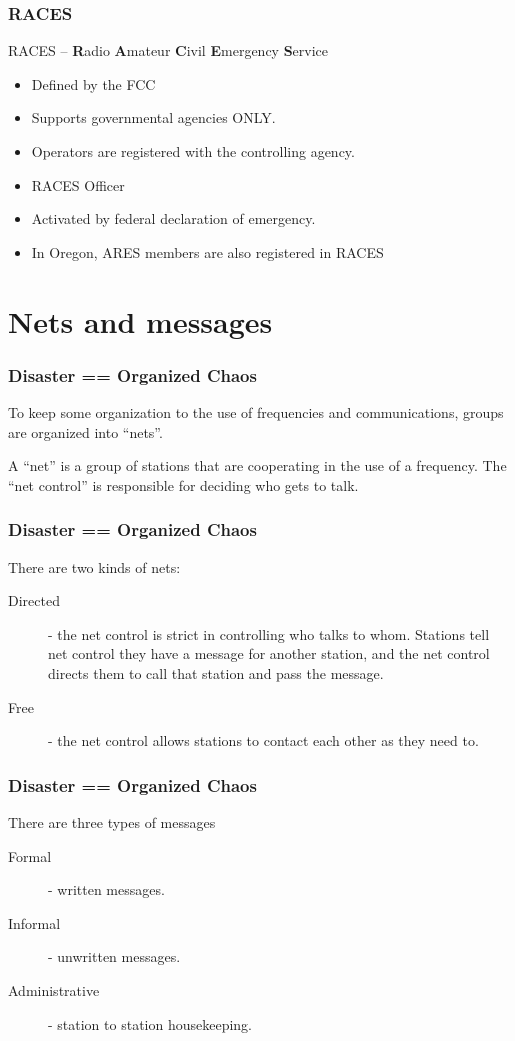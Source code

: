 \documentclass[10pt]{beamer}
\begin{document}
\begin{frame}
\frametitle{RACES}
RACES – \textbf{R}adio \textbf{A}mateur \textbf{C}ivil \textbf{E}mergency \textbf{S}ervice
\begin{itemize}
\item Defined by the FCC
\item Supports governmental agencies ONLY.
\item Operators are registered with the controlling agency. 
\item RACES Officer
\item Activated by federal declaration of emergency. 
\item In Oregon, ARES members are also registered in RACES
\end{itemize}
\end{frame}

\section{Nets and messages}
\begin{frame}
\frametitle{Disaster == Organized Chaos}
To keep some organization to the use of frequencies and communications,  groups are organized into “nets”.

A “net” is a group of stations that are cooperating in the use of a frequency. The “net control” is responsible for deciding who gets to talk. 
\end{frame}

\begin{frame}
\frametitle{Disaster == Organized Chaos}
There are two kinds of nets:
 \begin{description}
\item[Directed] - the net control is strict in controlling who talks to whom.  Stations tell net control they have a message for another station, and the net control directs them to call that station and pass the message.
\item[Free] - the net control allows stations to contact each other as they need to.   
\end{description}
\end{frame}

\begin{frame}
\frametitle{Disaster == Organized Chaos}
There are three types of messages
\begin{description}
\item[Formal] - written messages.
\item[Informal] - unwritten messages.
\item[Administrative] - station to station housekeeping.
\end{description}
\end{frame}
\end{document}
